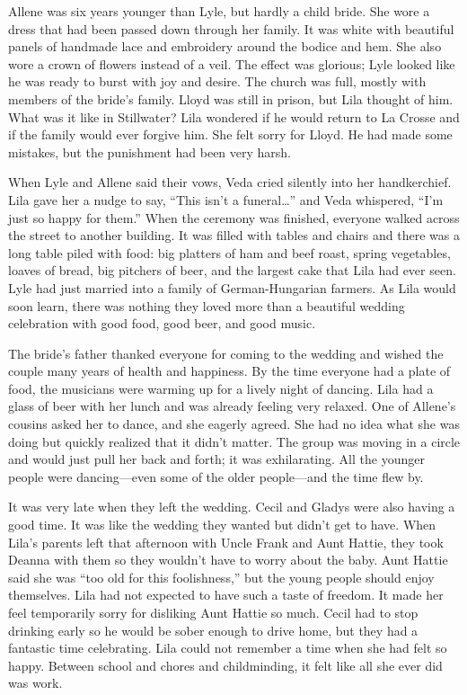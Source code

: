 \documentclass[
  letterpaper,
]{book}
\begin{document}
Allene was six years younger than Lyle, but hardly a child bride. She
wore a dress that had been passed down through her family. It was white
with beautiful panels of handmade lace and embroidery around the bodice
and hem. She also wore a crown of flowers instead of a veil. The effect
was glorious; Lyle looked like he was ready to burst with joy and
desire. The church was full, mostly with members of the bride's family.
Lloyd was still in prison, but Lila thought of him. What was it like in
Stillwater? Lila wondered if he would return to La Crosse and if the
family would ever forgive him. She felt sorry for Lloyd. He had made
some mistakes, but the punishment had been very harsh.

When Lyle and Allene said their vows, Veda cried silently into her
handkerchief. Lila gave her a nudge to say, ``This isn't a
funeral\ldots{}'' and Veda whispered, ``I'm just so happy for them.''
When the ceremony was finished, everyone walked across the street to
another building. It was filled with tables and chairs and there was a
long table piled with food: big platters of ham and beef roast, spring
vegetables, loaves of bread, big pitchers of beer, and the largest cake
that Lila had ever seen. Lyle had just married into a family of
German-Hungarian farmers. As Lila would soon learn, there was nothing
they loved more than a beautiful wedding celebration with good food,
good beer, and good music.

The bride's father thanked everyone for coming to the wedding and wished
the couple many years of health and happiness. By the time everyone had
a plate of food, the musicians were warming up for a lively night of
dancing. Lila had a glass of beer with her lunch and was already feeling
very relaxed. One of Allene's cousins asked her to dance, and she
eagerly agreed. She had no idea what she was doing but quickly realized
that it didn't matter. The group was moving in a circle and would just
pull her back and forth; it was exhilarating. All the younger people
were dancing---even some of the older people---and the time flew by.

It was very late when they left the wedding. Cecil and Gladys were also
having a good time. It was like the wedding they wanted but didn't get
to have. When Lila's parents left that afternoon with Uncle Frank and
Aunt Hattie, they took Deanna with them so they wouldn't have to worry
about the baby. Aunt Hattie said she was ``too old for this
foolishness,'' but the young people should enjoy themselves. Lila had
not expected to have such a taste of freedom. It made her feel
temporarily sorry for disliking Aunt Hattie so much. Cecil had to stop
drinking early so he would be sober enough to drive home, but they had a
fantastic time celebrating. Lila could not remember a time when she had
felt so happy. Between school and chores and childminding, it felt like
all she ever did was work.
\end{document}
